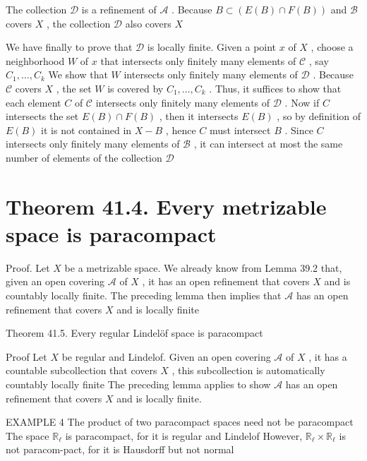 The collection \(\mathcal{D}\) is a refinement of \(\mathcal{A}\) . Because \(B \subset  \left( {E\left( B\right)  \cap  F\left( B\right) }\right)\) and \(\mathcal{B}\) covers \(X\) , the collection \(\mathcal{D}\) also covers \(X\)

We have finally to prove that \(\mathcal{D}\) is locally finite. Given a point \(x\) of \(X\) , choose a neighborhood \(W\) of \(x\) that intersects only finitely many elements of \(\mathcal{C}\) , say \({C}_{1},\ldots ,{C}_{k}\) We show that \(W\) intersects only finitely many elements of \(\mathcal{D}\) . Because \(\mathcal{C}\) covers \(X\) , the set \(W\) is covered by \({C}_{1},\ldots ,{C}_{k}\) . Thus, it suffices to show that each element \(C\) of \(\mathcal{C}\) intersects only finitely many elements of \(\mathcal{D}\) . Now if \(C\) intersects the set \(E\left( B\right)  \cap  F\left( B\right)\) , then it intersects \(E\left( B\right)\) , so by definition of \(E\left( B\right)\) it is not contained in \(X - B\) , hence \(C\) must intersect \(B\) . Since \(C\) intersects only finitely many elements of \(\mathcal{B}\) , it can intersect at most the same number of elements of the collection \(\mathcal{D}\)

\section*{Theorem 41.4. Every metrizable space is paracompact}

Proof. Let \(X\) be a metrizable space. We already know from Lemma 39.2 that, given an open covering \(\mathcal{A}\) of \(X\) , it has an open refinement that covers \(X\) and is countably locally finite. The preceding lemma then implies that \(\mathcal{A}\) has an open refinement that covers \(X\) and is locally finite

Theorem 41.5. Every regular Lindelöf space is paracompact

Proof Let \(X\) be regular and Lindelof. Given an open covering \(\mathcal{A}\) of \(X\) , it has a countable subcollection that covers \(X\) , this subcollection is automatically countably locally finite The preceding lemma applies to show \(\mathcal{A}\) has an open refinement that covers \(X\) and is locally finite.

EXAMPLE 4 The product of two paracompact spaces need not be paracompact The space \({\mathbb{R}}_{\ell }\) is paracompact, for it is regular and Lindelof However, \({\mathbb{R}}_{\ell } \times  {\mathbb{R}}_{\ell }\) is not paracom-pact, for it is Hausdorff but not normal

